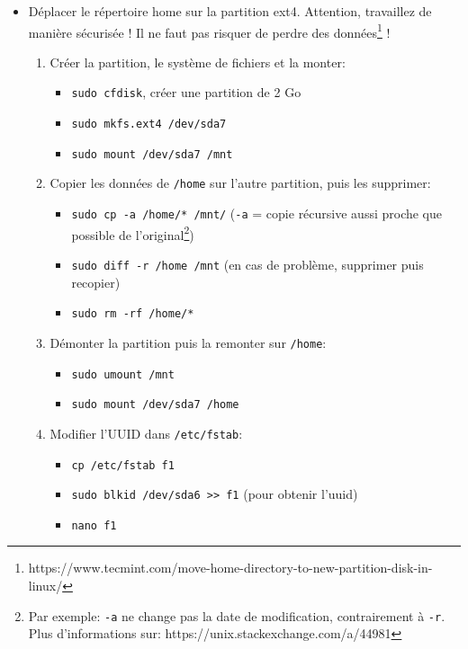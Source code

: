 \documentclass[a4paper]{article}
\begin{document}
\begin{itemize}
\item Déplacer le répertoire home sur la partition ext4. Attention, travaillez de manière sécurisée ! Il ne faut pas risquer de perdre des données\footnote{https://www.tecmint.com/move-home-directory-to-new-partition-disk-in-linux/} !
\begin{example}
    \begin{enumerate}
        \item Créer la partition, le système de fichiers et la monter:
        \begin{itemize}
            \item \texttt{sudo cfdisk}, créer une partition de 2 Go
            \item \texttt{sudo mkfs.ext4 /dev/sda7}
            \item \texttt{sudo mount /dev/sda7 /mnt}
        \end{itemize}
        \item Copier les données de \texttt{/home} sur l'autre partition, puis les supprimer:
        \begin{itemize}
            \item \texttt{sudo cp -a /home/* /mnt/} (\texttt{-a} = copie récursive aussi proche que possible de l'original\footnote{Par exemple: \texttt{-a} ne change pas la date de modification, contrairement à \texttt{-r}. Plus d'informations sur: https://unix.stackexchange.com/a/44981})
            \item \texttt{sudo diff -r /home /mnt} (en cas de problème, supprimer puis recopier)
            \item \texttt{sudo rm -rf /home/*}
        \end{itemize}
        \item Démonter la partition puis la remonter sur \texttt{/home}:
        \begin{itemize}
            \item \texttt{sudo umount /mnt}
            \item \texttt{sudo mount /dev/sda7 /home}
        \end{itemize}
        \item Modifier l'UUID dans \texttt{/etc/fstab}:
        \begin{itemize}
            \item \texttt{cp /etc/fstab f1}
            \item \texttt{sudo blkid /dev/sda6 >{}> f1} (pour obtenir l’uuid)
            \item \texttt{nano f1}
            \begin{enumerate}

\end{enumerate}
\end{itemize}
\end{enumerate}
\end{example}
\end{itemize}
\end{document}
